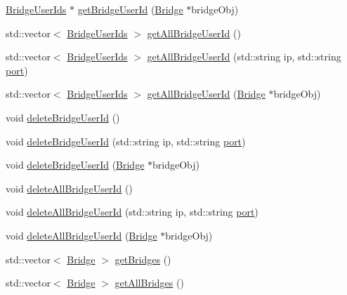\begin{DoxyCompactItemize}
\item 
\hyperlink{class_bridge_user_ids}{Bridge\+User\+Ids} $\ast$ \hyperlink{class_session_a9ffa12700d2c5c76d182def0889bb78f}{get\+Bridge\+User\+Id} (\hyperlink{class_bridge}{Bridge} $\ast$bridge\+Obj)
\item 
std\+::vector$<$ \hyperlink{class_bridge_user_ids}{Bridge\+User\+Ids} $>$ \hyperlink{class_session_a38d17c83c95082958506a5879eff7c93}{get\+All\+Bridge\+User\+Id} ()
\item 
std\+::vector$<$ \hyperlink{class_bridge_user_ids}{Bridge\+User\+Ids} $>$ \hyperlink{class_session_a0c60934144d2e92258c33f3560642293}{get\+All\+Bridge\+User\+Id} (std\+::string ip, std\+::string \hyperlink{_bridge_control_8_c_ae969f7204a7e846b98a88497dd85f672}{port})
\item 
std\+::vector$<$ \hyperlink{class_bridge_user_ids}{Bridge\+User\+Ids} $>$ \hyperlink{class_session_aebdcfdb0abc3e0eff515fcf274eec8b7}{get\+All\+Bridge\+User\+Id} (\hyperlink{class_bridge}{Bridge} $\ast$bridge\+Obj)
\item 
void \hyperlink{class_session_a0ce543e30e589f57f424b223e78d7727}{delete\+Bridge\+User\+Id} ()
\item 
void \hyperlink{class_session_ae72de69f3e1a148bc633b348e984bf63}{delete\+Bridge\+User\+Id} (std\+::string ip, std\+::string \hyperlink{_bridge_control_8_c_ae969f7204a7e846b98a88497dd85f672}{port})
\item 
void \hyperlink{class_session_add42d80da3d9dd34278e753ef623a7c8}{delete\+Bridge\+User\+Id} (\hyperlink{class_bridge}{Bridge} $\ast$bridge\+Obj)
\item 
void \hyperlink{class_session_ab7c1c96f6cc41a6f9bbf8915ddd3a171}{delete\+All\+Bridge\+User\+Id} ()
\item 
void \hyperlink{class_session_a6331ee5838df2948eb6d92423ba7f976}{delete\+All\+Bridge\+User\+Id} (std\+::string ip, std\+::string \hyperlink{_bridge_control_8_c_ae969f7204a7e846b98a88497dd85f672}{port})
\item 
void \hyperlink{class_session_ad209a3bf4d24d5f1aff23a011ef25f6f}{delete\+All\+Bridge\+User\+Id} (\hyperlink{class_bridge}{Bridge} $\ast$bridge\+Obj)
\item 
std\+::vector$<$ \hyperlink{class_bridge}{Bridge} $>$ \hyperlink{class_session_a44ef564f39f3b819313e339c0b174f4f}{get\+Bridges} ()
\item 
std\+::vector$<$ \hyperlink{class_bridge}{Bridge} $>$ \hyperlink{class_session_aecaecc666ef5e3344420b36e40d5b0cc}{get\+All\+Bridges} ()
\item 

\end{DoxyCompactItemize}
